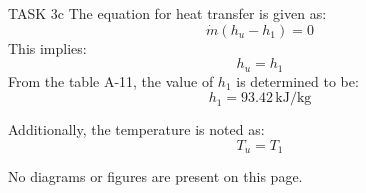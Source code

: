 TASK 3c  
The equation for heat transfer is given as:  
\[
\dot{m} \left( h_u - h_1 \right) = 0
\]  
This implies:  
\[
h_u = h_1
\]  
From the table A-11, the value of \( h_1 \) is determined to be:  
\[
h_1 = 93.42 \, \text{kJ/kg}
\]  

Additionally, the temperature is noted as:  
\[
T_u = T_1
\]  

No diagrams or figures are present on this page.